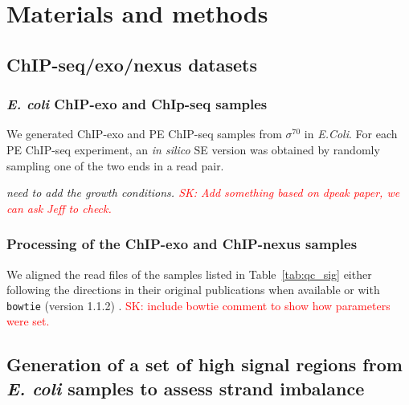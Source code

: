 \documentclass{bmcart}
\newcommand{\SK}[1]{\textcolor{red}{SK: #1}}
\newcommand{\sig}{\sigma^{70}}
\begin{document}
\section*{Materials and methods}
\label{sec:methods}

\subsection*{ChIP-seq/exo/nexus datasets}

\subsubsection*{\textit{E. coli} ChIP-exo and ChIp-seq samples}

We generated ChIP-exo and PE ChIP-seq samples from $\sig$ in
\emph{E.Coli}. For each PE ChIP-seq experiment, an \emph{in silico} SE
version was obtained by randomly sampling one of the two ends in a read pair.

{\color{red}\emph{need to add the growth conditions. \SK{Add something based on dpeak paper, we can ask Jeff to check.}}}

\subsubsection*{Processing of the ChIP-exo and ChIP-nexus samples}
We aligned the read files of the samples listed in Table~\ref{tab:qc_sig}
either following the directions in their original publications when available or with \texttt{bowtie} (version 1.1.2) \cite{bowtie}. 
\SK{include bowtie comment to show how parameters were set.}

\subsection*{Generation of a set of high signal regions from \textit{E. coli} samples to assess strand imbalance}
\end{document}
